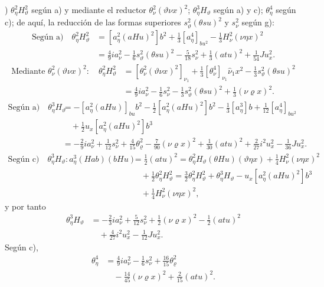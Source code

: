 \documentclass[11pt]{article}
\newcommand{\R}{\varrho}
\begin{document}
) $\theta_\eta^2H_\vartheta^2$ según a) y mediante el reductor $\theta_\nu^2(\vartheta\nu x)^2$; $\theta_\eta^3H_\vartheta$ según a) y c); $\theta_\eta^4$ según c); de aquí, la reducción de las formas superiores $s_\vartheta^2(\theta su)^2$ y $s_\nu^2$ según g):
\[
\begin{aligned}
\text{Según a)}\quad
\theta_\eta^2H_\vartheta^2&=[a_\eta^2(aHu)^2]b^2+\frac13[a_\eta^4]_{bu^2}-\frac13H_\nu^2(\nu\eta x)^2\\
&=\frac49ia_\nu^2-\frac16s_\vartheta^2(\theta su)^2-\frac5{18}s_\nu^2+\frac13(atu)^2+\frac1{54}Ju_x^2.
\end{aligned}
\]
\[
\begin{aligned}
\text{Mediante }\theta_\nu^2(\vartheta\nu x)^2:
\quad\theta_\eta^2H_\vartheta^2
&=[\theta_\nu^2(\vartheta\nu x)^2]_{\nu_1}+\frac13[\theta_\nu^4]_{\nu_1}\hat\nu_1x^2-\frac13s_\vartheta^2(\theta su)^2\\
&=\frac49ia_\nu^2-\frac16s_\nu^2-\frac13s_\vartheta^2(\theta su)^2+\frac13(\nu\R x)^2.
\end{aligned}
\]
\[
\begin{aligned}
\text{Según a)}\quad
\theta_\eta^3H_\vartheta&=-[a_\eta^2(aHu)]_{bu}b^2-\frac12[a_\eta^2(aHu)^2]b^2-\frac13[a_\eta^3]b+\frac1{12}[a_\eta^4]_{bu^2}\\
&\quad+\frac12u_x[a_\eta^2(aHu)^2]b^3\\
&=-\frac29ia_\nu^2+\frac1{12}s_\nu^2+\frac4{15}\theta_\R^2-\frac7{90}(\nu\R x)^2+\frac1{30}(atu)^2+\frac2{27}i^2u_x^2-\frac1{36}Ju_x^2.
\end{aligned}
\]
\[
\begin{aligned}
\text{Según c)}\quad
\theta_\eta^3H_\vartheta:
 a_\eta^3(Hab)(bHu)&=\frac12(atu)^2
=\theta_\eta^2H_\vartheta(\theta Hu)(\vartheta\eta x)+\frac14H_\nu^2(\nu\eta x)^2\\
&\quad+\frac12\theta_\eta^2H_\vartheta^2
=\frac32\theta_\eta^2H_\vartheta^2+\theta_\eta^3H_\vartheta-u_x[a_\eta^2(aHu)^2]b^3\\
&\quad+\frac14H_\nu^2(\nu\eta x)^2,
\end{aligned}
\]
y por tanto
\[
\begin{aligned}
\theta_\eta^3H_\vartheta&=-\frac23ia_\nu^2+\frac5{12}s_\nu^2+\frac12(\nu\R x)^2-\frac12(atu)^2\\
&\quad+\frac4{27}i^2u_x^2-\frac1{12}Ju_x^2.
\end{aligned}
\]
Según c),
\[
\begin{aligned}
\theta_\eta^4&=\frac49ia_\nu^2-\frac16s_\nu^2+\frac{16}{15}\theta_\R^2\\
&\quad-\frac{14}{45}(\nu\R x)^2+\frac2{15}(atu)^2.
\end{aligned}
\]
\end{document}
